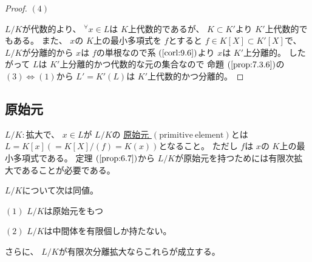 \documentclass[../master_galois_theory]{subfiles}
\begin{document}
\begin{proof}
  $(4)$

  $L/K$が代数的より、 ${}^\forall x \in L$は $K$上代数的であるが、
  $K \subset K'$より $K'$上代数的でもある。
  また、 $x$の $K$上の最小多項式を $f$とすると
  $f \in K[X] \subset K'[X]$で、 $L/K$が分離的から
  $x$は $f$の単根なので系 $(\mathrm{\ref{corl:9.6}})$より
  $x$は $K'$上分離的。
  したがって $L$は $K'$上分離的かつ代数的な元の集合なので
  命題 $(\mathrm{\ref{prop:7.3.6}})$の $(3) \Leftrightarrow (1)$から
  $L' = K'(L)$は $K'$上代数的かつ分離的。
\end{proof}

\subsection{原始元}

\begin{defi}
  $L/K:$拡大で、 $x \in L$が $L/K$の
  \underline{原始元 $(\mathrm{primitive \  element})$}とは
  $L = K[x] (=K[X]/(f) = K(x))$となること。
  ただし $f$は $x$の $K$上の最小多項式である。
  定理 $(\mathrm{\ref{prop:6.7}})$から $L/K$が原始元を持つためには有限次拡大であることが必要である。
\end{defi}

\begin{theo}
  $L/K$について次は同値。

  $(1)$
  $L/K$は原始元をもつ

  $(2)$
  $L/K$は中間体を有限個しか持たない。

  さらに、 $L/K$が有限次分離拡大ならこれらが成立する。
\end{theo}
\end{document}
